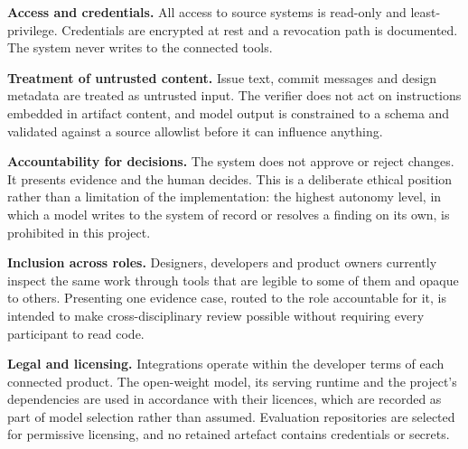 \textbf{Access and credentials.} All access to source systems is read-only and
least-privilege. Credentials are encrypted at rest and a revocation path is
documented. The system never writes to the connected tools.

\textbf{Treatment of untrusted content.} Issue text, commit messages and design
metadata are treated as untrusted input. The verifier does not act on
instructions embedded in artifact content, and model output is constrained to a
schema and validated against a source allowlist before it can influence
anything.

\textbf{Accountability for decisions.} The system does not approve or reject
changes. It presents evidence and the human decides. This is a deliberate
ethical position rather than a limitation of the implementation: the highest
autonomy level, in which a model writes to the system of record or resolves a
finding on its own, is prohibited in this project.

\textbf{Inclusion across roles.} Designers, developers and product owners
currently inspect the same work through tools that are legible to some of them
and opaque to others. Presenting one evidence case, routed to the role
accountable for it, is intended to make cross-disciplinary review possible
without requiring every participant to read code.

\textbf{Legal and licensing.} Integrations operate within the developer terms of
each connected product. The open-weight model, its serving runtime and the
project's dependencies are used in accordance with their licences, which are
recorded as part of model selection rather than assumed. Evaluation repositories
are selected for permissive licensing, and no retained artefact contains
credentials or secrets.

